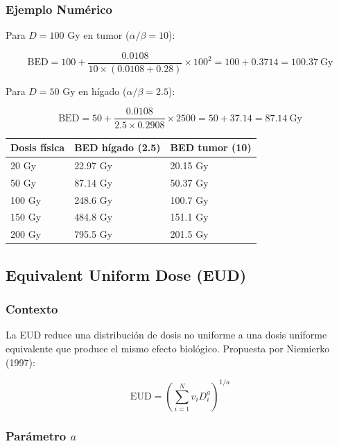 \documentclass[12pt,a4paper]{article}
\begin{document}
\subsubsection{Ejemplo Numérico}

Para $D = 100$ Gy en tumor ($\alpha/\beta = 10$):

$$\text{BED} = 100 + \frac{0.0108}{10 \times (0.0108 + 0.28)} \times 100^2 = 100 + 0.3714 = 100.37\ \text{Gy}$$

Para $D = 50$ Gy en hígado ($\alpha/\beta = 2.5$):

$$\text{BED} = 50 + \frac{0.0108}{2.5 \times 0.2908} \times 2500 = 50 + 37.14 = 87.14\ \text{Gy}$$

\begin{tabular}{p{2.5cm} p{3.5cm} p{3.5cm}}
\toprule
\textbf{Dosis física} & \textbf{BED hígado (2.5)} & \textbf{BED tumor (10)} \\
\midrule
20 Gy & 22.97 Gy & 20.15 Gy \\
50 Gy & 87.14 Gy & 50.37 Gy \\
100 Gy & 248.6 Gy & 100.7 Gy \\
150 Gy & 484.8 Gy & 151.1 Gy \\
200 Gy & 795.5 Gy & 201.5 Gy \\
\bottomrule
\end{tabular}

\subsection{Equivalent Uniform Dose (EUD)}

\subsubsection{Contexto}

La EUD reduce una distribución de dosis no uniforme a una dosis uniforme equivalente que produce el mismo efecto biológico. Propuesta por Niemierko (1997):

$$\text{EUD} = \left(\sum_{i=1}^{N} v_i D_i^a\right)^{1/a}$$


\subsubsection{Parámetro $a$}
\end{document}
